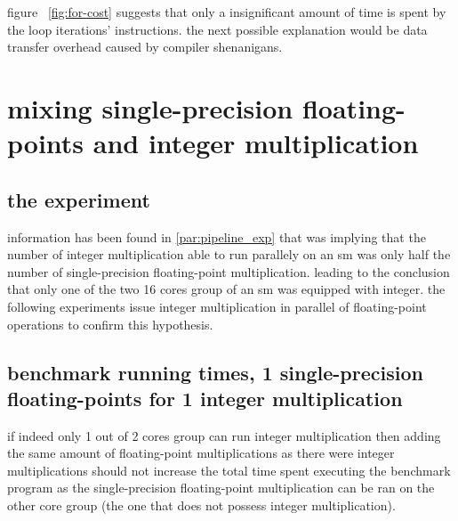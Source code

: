 \documentclass{report}
\begin{document}
    figure ~\ref{fig:for-cost} suggests that only a insignificant amount of time is spent by the loop
    iterations' instructions. the next possible explanation would be data transfer overhead caused
    by compiler shenanigans.

\section{mixing single-precision floating-points and integer multiplication}
	\subsection{the experiment}
	information has been found in \ref{par:pipeline_exp} that was implying that the number of 
    integer multiplication able to run parallely on an sm was only half the number of 
    single-precision floating-point multiplication. leading to the conclusion that only one of
    the two 16 cores group of an sm was equipped with integer. the following experiments issue 
    integer multiplication in parallel of floating-point operations to confirm this hypothesis.
	\subsection{benchmark running times, 1 single-precision floating-points for 1 integer multiplication}
	if indeed only 1 out of 2 cores group can run integer multiplication then
    adding the same amount of floating-point multiplications as there were integer
    multiplications should not increase the total time spent executing the benchmark 
    program as the single-precision floating-point multiplication can
    be ran on the other core group (the one that does not possess integer multiplication).
	
\end{document}

